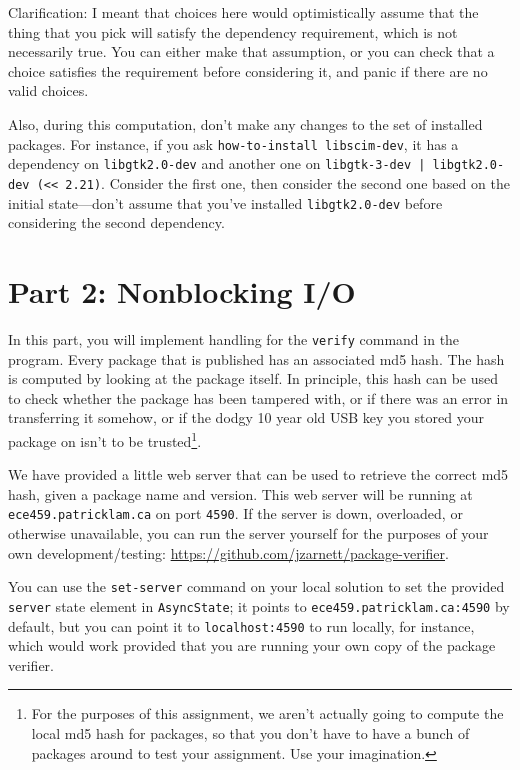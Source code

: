 \documentclass[12pt]{article}
\renewcommand{\_}{\kern-1.5pt\textunderscore\kern-1.5pt}
\begin{document}
\vspace{1em}
Clarification: I meant that choices here would optimistically assume that the thing that you pick will satisfy the dependency requirement, which is not necessarily true. You can either make that assumption, or you can check that a choice satisfies the requirement before considering it, and panic if there are no valid choices.

\vspace*{1em}
Also, during this computation, don't make any changes to the set of installed packages. For instance, if you ask \texttt{how-to-install libscim-dev}, it has a dependency on \verb+libgtk2.0-dev+ and another one on \verb+libgtk-3-dev | libgtk2.0-dev (<< 2.21)+. Consider the first one, then consider the second one based on the initial state---don't assume that you've installed \verb+libgtk2.0-dev+ before considering the second dependency.


\vspace{\baselineskip}
\section*{Part 2: Nonblocking I/O }\par

In this part, you will implement handling for the \texttt{verify} command in the program. Every package that is published has an associated md5 hash. The hash is computed by looking at the package itself. In principle, this hash can be used to check whether the package has been tampered with, or if there was an error in transferring it somehow, or if the dodgy 10 year old USB key you stored your package on isn't to be trusted\footnote{For the purposes of this assignment, we aren't actually going to compute the local md5 hash for packages, so that you don't have to have a bunch of packages around to test your assignment. Use your imagination.}.\par

\vspace{1em}
We have provided a little web server that can be used to retrieve the correct md5 hash, given a package name and version. This web server will be running at \texttt{ece459.patricklam.ca} on port \texttt{4590}. If the server is down, overloaded, or otherwise unavailable, you can run the server yourself for the purposes of your own development/testing: \url{https://github.com/jzarnett/package-verifier}. 

\vspace{1em}
You can use the \texttt{set-server} command on your local solution to set the provided \texttt{server} state element in \texttt{AsyncState}; it points to \texttt{ece459.patricklam.ca:4590} by default, but you can point it to \texttt{localhost:4590} to run locally, for instance, which would work provided that you are running your own copy of the package verifier. \par 
\end{document}
